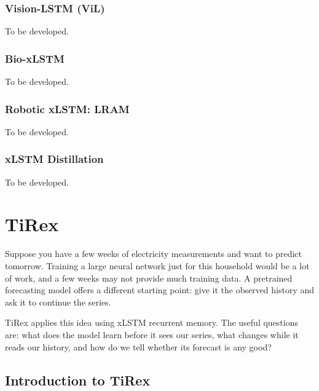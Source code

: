 \documentclass[11pt, oneside]{book}
\let\originalsection\section
\renewcommand{\section}{\Needspace{7\baselineskip}\originalsection}
\let\originalsubsection\subsection
\renewcommand{\subsection}{\Needspace{6\baselineskip}\originalsubsection}
\begin{document}
\subsection{Vision-LSTM (ViL)}\label{sec:source-8-3-7}
{\small\color{gray!70!black} To be developed.}

\subsection{Bio-xLSTM}\label{sec:source-8-3-8}
{\small\color{gray!70!black} To be developed.}

\subsection{Robotic xLSTM: LRAM}\label{sec:source-8-3-9}
{\small\color{gray!70!black} To be developed.}

\subsection{xLSTM Distillation}\label{sec:source-8-3-10}
{\small\color{gray!70!black} To be developed.}

\chapter{TiRex}\label{ch:source-9}
Suppose you have a few weeks of electricity measurements and want to predict tomorrow. Training a large neural network just for this household would be a lot of work, and a few weeks may not provide much training data. A pretrained forecasting model offers a different starting point: give it the observed history and ask it to continue the series.

TiRex applies this idea using xLSTM recurrent memory. The useful questions are: what does the model learn before it sees our series, what changes while it reads our history, and how do we tell whether its forecast is any good?

\section{Introduction to TiRex}\label{sec:source-9-1}
\end{document}
